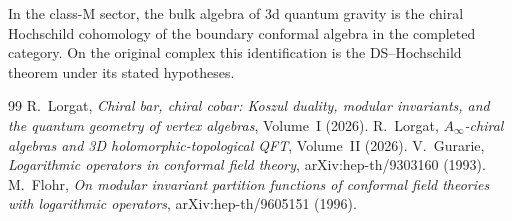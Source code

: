 \documentclass[11pt]{amsart}
\theoremstyle{definition}
\theoremstyle{remark}
\begin{document}
In the class-M sector, the bulk algebra of 3d quantum gravity is the
chiral Hochschild cohomology of the boundary conformal algebra in the
completed category. On the original complex this identification is the
DS--Hochschild theorem under its stated hypotheses.

\begin{thebibliography}{99}
 R.~Lorgat,
\emph{Chiral bar, chiral cobar: Koszul duality, modular invariants,
and the quantum geometry of vertex algebras}, Volume~I (2026).
 R.~Lorgat,
\emph{$A_\infty$-chiral algebras and 3D holomorphic-topological QFT},
Volume~II (2026).
 V.~Gurarie,
\emph{Logarithmic operators in conformal field theory},
arXiv:hep-th/9303160 (1993).
 M.~Flohr,
\emph{On modular invariant partition functions of conformal field
theories with logarithmic operators},
arXiv:hep-th/9605151 (1996).
\end{thebibliography}
\end{document}
